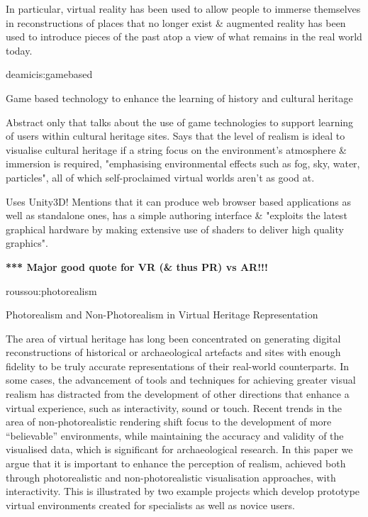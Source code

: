 In particular, virtual reality has been used to allow people to immerse themselves in reconstructions of places that no longer exist \& augmented reality has been used to introduce pieces of the past atop a view of what remains in the real world today.


deamicis:gamebased

Game based technology to enhance the learning of history and cultural heritage

Abstract only that talks about the use of game technologies to support learning of users
within cultural heritage sites. Says that the level of realism is ideal to visualise cultural
heritage if a string focus on the environment's atmosphere \& immersion is required, "emphasising
environmental effects such as fog, sky, water, particles", all of which self-proclaimed virtual
worlds aren't as good at.
        
Uses Unity3D! Mentions that it can produce web browser based applications as well as standalone
ones, has a simple authoring interface \& "exploits the latest graphical hardware by making extensive
use of shaders to deliver high quality graphics".

\textbf{*** Major good quote for VR (\& thus PR) vs AR!!!}


roussou:photorealism

Photorealism and Non-Photorealism
in Virtual Heritage Representation

The area of virtual heritage has long been concentrated on generating digital reconstructions of historical or
archaeological artefacts and sites with enough fidelity to be truly accurate representations of their real-world
counterparts. In some cases, the advancement of tools and techniques for achieving greater visual realism has
distracted from the development of other directions that enhance a virtual experience, such as interactivity, sound
or touch. Recent trends in the area of non-photorealistic rendering shift focus to the development of more “believable”
environments, while maintaining the accuracy and validity of the visualised data, which is significant for
archaeological research. In this paper we argue that it is important to enhance the perception of realism, achieved
both through photorealistic and non-photorealistic visualisation approaches, with interactivity. This is illustrated
by two example projects which develop prototype virtual environments created for specialists as well as novice
users.

